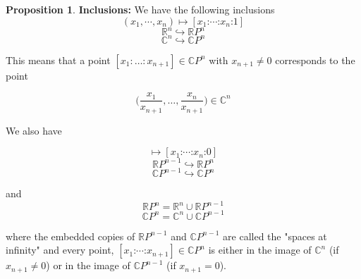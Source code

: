 \documentclass{article}
\theoremstyle{definition}
\newtheorem{proposition}{Proposition}[section]
\begin{document}
\begin{proposition} {\bf Inclusions:} We have the following inclusions 
\begin{equation*}
(x_1, \cdots, x_n) \mapsto [x_1 \mathord{:} \cdots \mathord{:} x_n \mathord{:} 1]
\end{equation*}
\begin{equation*}
\mathbb{R}^n  \hookrightarrow \mathbb{R}P^n
\end{equation*}
\begin{equation*}
\mathbb{C}^n  \hookrightarrow \mathbb{C}P^n
 \end{equation*}
 
\bigskip
\noindent
This means that a point $[x_1:\hdots: x_{n+1}] \in \mathbb{C}P^n$ with $x_{n+1} \neq 0$ corresponds to the point

\bigskip
\begin{equation*}
\Bigg (  \frac{x_1}{x_{n+1}}, \hdots, \frac{x_n}{x_{n+1}} \Bigg ) \in \mathbb{C}^n
\end{equation*}

\bigskip
\noindent
We also have

\begin{equation*}
[x_1 \mathord{:}   \cdots \mathord{:} x_n] \mapsto [x_1 \mathord{:}  \cdots \mathord{:}  x_n \mathord{:} 0]
\end{equation*}
\begin{equation*}
\mathbb{R}P^{n-1}  \hookrightarrow \mathbb{R}P^n
\end{equation*}
\begin{equation*}
\mathbb{C}P^{n-1}  \hookrightarrow \mathbb{C}P^n
 \end{equation*}
 
 \bigskip
 \noindent
 and
 \begin{equation*}
\mathbb{R}P^n  = \mathbb{R}^n \cup \mathbb{R}P^{n-1}
\end{equation*}
\begin{equation*}
\mathbb{C}P^n  = \mathbb{C}^n \cup \mathbb{C}P^{n-1}
 \end{equation*}
 
 \bigskip
 \noindent
where the embedded copies of $\mathbb{R}P^{n - 1}$ and $\mathbb{C}P^{n - 1}$ are called the "spaces at infinity" and 
every point, $[x_1 \mathord{:}  \cdots \mathord{:}   x_{n+1}] \in \mathbb{C}P^n$ is either in the image of $\mathbb{C}^n$ (if $x_{n+1} \neq 0$) 
or in the image of $\mathbb{C}P^{n - 1}$ (if $x_{n + 1} = 0$).
\end{proposition}
\end{document}
